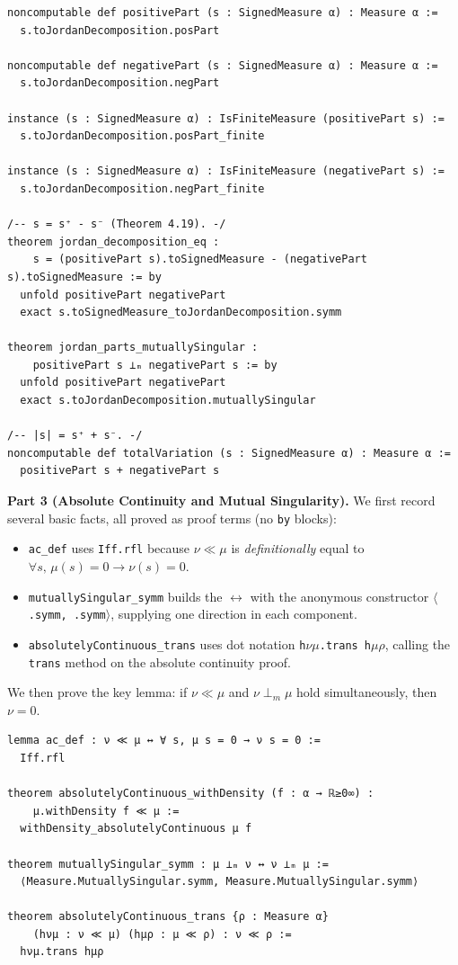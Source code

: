 \documentclass[11pt]{article}
\begin{document}
\begin{verbatim}
noncomputable def positivePart (s : SignedMeasure α) : Measure α :=
  s.toJordanDecomposition.posPart

noncomputable def negativePart (s : SignedMeasure α) : Measure α :=
  s.toJordanDecomposition.negPart

instance (s : SignedMeasure α) : IsFiniteMeasure (positivePart s) :=
  s.toJordanDecomposition.posPart_finite

instance (s : SignedMeasure α) : IsFiniteMeasure (negativePart s) :=
  s.toJordanDecomposition.negPart_finite

/-- s = s⁺ - s⁻ (Theorem 4.19). -/
theorem jordan_decomposition_eq :
    s = (positivePart s).toSignedMeasure - (negativePart s).toSignedMeasure := by
  unfold positivePart negativePart
  exact s.toSignedMeasure_toJordanDecomposition.symm

theorem jordan_parts_mutuallySingular :
    positivePart s ⟂ₘ negativePart s := by
  unfold positivePart negativePart
  exact s.toJordanDecomposition.mutuallySingular

/-- |s| = s⁺ + s⁻. -/
noncomputable def totalVariation (s : SignedMeasure α) : Measure α :=
  positivePart s + negativePart s
\end{verbatim}

\medskip
\noindent
\textbf{Part 3 (Absolute Continuity and Mutual Singularity).}
We first record several basic facts, all proved as proof terms (no \texttt{by} blocks):
\begin{itemize}
\item \texttt{ac\_def} uses \texttt{Iff.rfl} because $\nu \ll \mu$ is \emph{definitionally} equal to $\forall s,\, \mu(s) = 0 \to \nu(s) = 0$.
\item \texttt{mutuallySingular\_symm} builds the $\leftrightarrow$ with the anonymous constructor $\langle$\texttt{.symm, .symm}$\rangle$, supplying one direction in each component.
\item \texttt{absolutelyContinuous\_trans} uses dot notation \texttt{h$\nu\mu$.trans~h$\mu\rho$}, calling the \texttt{trans} method on the absolute continuity proof.
\end{itemize}
We then prove the key lemma: if $\nu \ll \mu$ and $\nu \perp_m \mu$ hold simultaneously, then $\nu = 0$.

\begin{verbatim}
lemma ac_def : ν ≪ μ ↔ ∀ s, μ s = 0 → ν s = 0 :=
  Iff.rfl

theorem absolutelyContinuous_withDensity (f : α → ℝ≥0∞) :
    μ.withDensity f ≪ μ :=
  withDensity_absolutelyContinuous μ f

theorem mutuallySingular_symm : μ ⟂ₘ ν ↔ ν ⟂ₘ μ :=
  ⟨Measure.MutuallySingular.symm, Measure.MutuallySingular.symm⟩

theorem absolutelyContinuous_trans {ρ : Measure α}
    (hνμ : ν ≪ μ) (hμρ : μ ≪ ρ) : ν ≪ ρ :=
  hνμ.trans hμρ
\end{verbatim}
\end{document}
